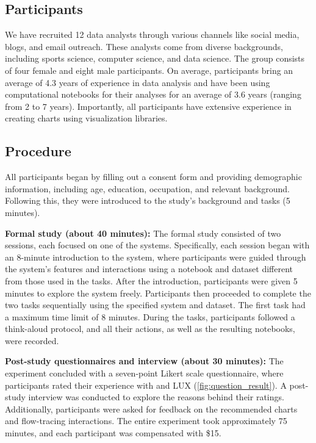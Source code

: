\subsection{Participants} 
We have recruited 12 data analysts through various channels like social media, blogs, and email outreach. 
These analysts come from diverse backgrounds, including sports science, computer science, and data science. The group consists of four female and eight male participants. On average, participants bring an average of 4.3 years of experience in data analysis and have been using computational notebooks for their analyses for an average of 3.6 years (ranging from 2 to 7 years). Importantly, all participants have extensive experience in creating charts using visualization libraries.

\subsection{Procedure} 
All participants began by filling out a consent form and providing demographic information, including age, education, occupation, and relevant background. 
Following this, they were introduced to the study's background and tasks (5 minutes).

\textbf{Formal study (about 40 minutes): }The formal study consisted of two sessions, each focused on one of the systems. 
Specifically, each session began with an 8-minute introduction to the system, where participants were guided through the system's features and interactions using a notebook and dataset different from those used in the tasks. 
After the introduction, participants were given 5 minutes to explore the system freely.
Participants then proceeded to complete the two tasks sequentially using the specified system and dataset. 
The first task had a maximum time limit of 8 minutes.
During the tasks, participants followed a think-aloud protocol, and all their actions, as well as the resulting notebooks, were recorded.

\textbf{Post-study questionnaires and interview (about 30 minutes): }The experiment concluded with a seven-point Likert scale questionnaire, where participants rated their experience with \system{} and LUX (\autoref{fig:question_result}). A post-study interview was conducted to explore the reasons behind their ratings. Additionally, participants were asked for feedback on the recommended charts and flow-tracing interactions. 
The entire experiment took approximately 75 minutes, and each participant was compensated with \$15.

